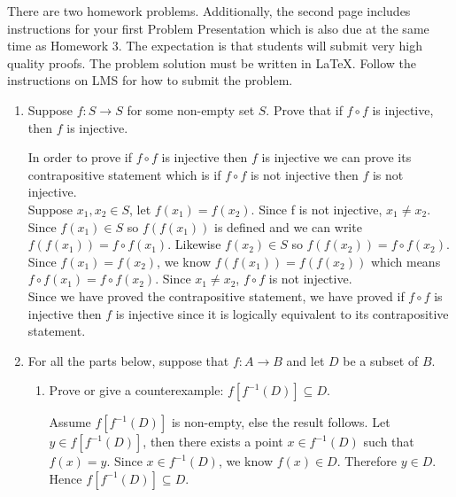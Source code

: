 \documentclass{article}
\begin{document}

There are two homework problems. Additionally, the second page includes instructions for your first Problem Presentation which is also due at the same time as Homework 3.  The expectation is that students
will submit very high quality proofs. The problem solution must be written
in LaTeX. Follow the instructions on LMS for how to submit the problem.

\bigskip
\bigskip
\begin{enumerate}

\item Suppose $f: S \rightarrow S$ for some non-empty set $S$. Prove that if $f \circ f$ is injective, then $f$ is injective. \\
\vspace{.15in}

 In order to prove if $f \circ f$ is injective then $f$ is injective we can prove its contrapositive statement which is  if $f \circ f$ is not injective then $f$ is not injective.\\

Suppose $x_1,x_2 \in S$, let $f(x_1) = f(x_2)$. Since f is not injective, $x_1 \neq x_2$. Since $f(x_1) \in S$ so $f(f(x_1))$ is defined and we can write $f(f(x_1)) = f \circ f (x_1)$. Likewise $f(x_2) \in S$ so $f(f(x_2)) = f \circ f (x_2)$. Since $f(x_1) = f(x_2)$, we know $f(f(x_1)) = f(f (x_2))$ which means $f \circ f (x_1) = f \circ f (x_2)$. Since $x_1 \neq x_2$, $f \circ f$ is not injective.\\

Since we have proved the contrapositive statement, we have proved if $f \circ f$ is injective then $f$ is injective since it is logically equivalent to its contrapositive statement.\\

\item For all the parts below, suppose that $f:A \rightarrow B$ and let $D$ be a subset of $B$.
\begin{enumerate}
\item Prove or give a counterexample: $f\left[f^{-1} (D) \right] \subseteq D.$
\vspace{.15in}

 Assume $f[f^{-1}(D)]$ is non-empty, else the result follows. Let $y \in f[f^{-1}(D)]$, then there exists a point $x \in f^{-1}(D)$ such that $f(x) = y$. Since $x \in f^{-1}(D)$, we know $f(x) \in D$. Therefore $y \in D$. Hence $f[f^{-1}(D)] \subseteq D$.\\


\end{enumerate}
\end{enumerate}
\end{document}
